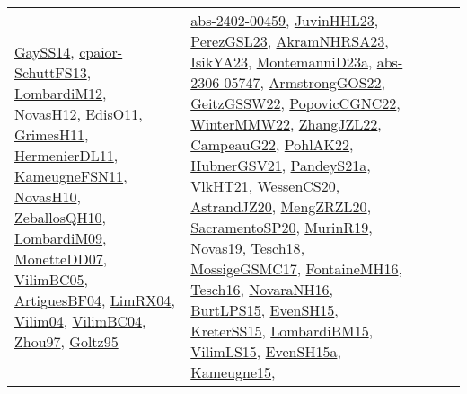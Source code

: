 {\begin{longtable}{llp{6cm}p{6cm}p{6cm}}
\href{papers/GaySS14.pdf}{GaySS14}\cite{GaySS14}, \href{papers/cpaior-SchuttFS13.pdf}{cpaior-SchuttFS13}\cite{cpaior-SchuttFS13}, \href{articles/LombardiM12.pdf}{LombardiM12}\cite{LombardiM12}, \href{articles/NovasH12.pdf}{NovasH12}\cite{NovasH12}, \href{papers/EdisO11.pdf}{EdisO11}\cite{EdisO11}, \href{papers/GrimesH11.pdf}{GrimesH11}\cite{GrimesH11}, \href{papers/HermenierDL11.pdf}{HermenierDL11}\cite{HermenierDL11}, \href{papers/KameugneFSN11.pdf}{KameugneFSN11}\cite{KameugneFSN11}, \href{articles/NovasH10.pdf}{NovasH10}\cite{NovasH10}, \href{articles/ZeballosQH10.pdf}{ZeballosQH10}\cite{ZeballosQH10}, \href{papers/LombardiM09.pdf}{LombardiM09}\cite{LombardiM09}, \href{papers/MonetteDD07.pdf}{MonetteDD07}\cite{MonetteDD07}, \href{articles/VilimBC05.pdf}{VilimBC05}\cite{VilimBC05}, \href{papers/ArtiguesBF04.pdf}{ArtiguesBF04}\cite{ArtiguesBF04}, \href{papers/LimRX04.pdf}{LimRX04}\cite{LimRX04}, \href{papers/Vilim04.pdf}{Vilim04}\cite{Vilim04}, \href{papers/VilimBC04.pdf}{VilimBC04}\cite{VilimBC04}, \href{articles/Zhou97.pdf}{Zhou97}\cite{Zhou97}, \href{papers/Goltz95.pdf}{Goltz95}\cite{Goltz95} & \href{articles/abs-2402-00459.pdf}{abs-2402-00459}\cite{abs-2402-00459}, \href{papers/JuvinHHL23.pdf}{JuvinHHL23}\cite{JuvinHHL23}, \href{papers/PerezGSL23.pdf}{PerezGSL23}\cite{PerezGSL23}, \href{articles/AkramNHRSA23.pdf}{AkramNHRSA23}\cite{AkramNHRSA23}, \href{articles/IsikYA23.pdf}{IsikYA23}\cite{IsikYA23}, \href{articles/MontemanniD23a.pdf}{MontemanniD23a}\cite{MontemanniD23a}, \href{articles/abs-2306-05747.pdf}{abs-2306-05747}\cite{abs-2306-05747}, \href{papers/ArmstrongGOS22.pdf}{ArmstrongGOS22}\cite{ArmstrongGOS22}, \href{papers/GeitzGSSW22.pdf}{GeitzGSSW22}\cite{GeitzGSSW22}, \href{papers/PopovicCGNC22.pdf}{PopovicCGNC22}\cite{PopovicCGNC22}, \href{papers/WinterMMW22.pdf}{WinterMMW22}\cite{WinterMMW22}, \href{papers/ZhangJZL22.pdf}{ZhangJZL22}\cite{ZhangJZL22}, \href{articles/CampeauG22.pdf}{CampeauG22}\cite{CampeauG22}, \href{articles/PohlAK22.pdf}{PohlAK22}\cite{PohlAK22}, \href{articles/HubnerGSV21.pdf}{HubnerGSV21}\cite{HubnerGSV21}, \href{articles/PandeyS21a.pdf}{PandeyS21a}\cite{PandeyS21a}, \href{articles/VlkHT21.pdf}{VlkHT21}\cite{VlkHT21}, \href{papers/WessenCS20.pdf}{WessenCS20}\cite{WessenCS20}, \href{articles/AstrandJZ20.pdf}{AstrandJZ20}\cite{AstrandJZ20}, \href{articles/MengZRZL20.pdf}{MengZRZL20}\cite{MengZRZL20}, \href{articles/SacramentoSP20.pdf}{SacramentoSP20}\cite{SacramentoSP20}, \href{papers/MurinR19.pdf}{MurinR19}\cite{MurinR19}, \href{articles/Novas19.pdf}{Novas19}\cite{Novas19}, \href{papers/Tesch18.pdf}{Tesch18}\cite{Tesch18}, \href{papers/MossigeGSMC17.pdf}{MossigeGSMC17}\cite{MossigeGSMC17}, \href{papers/FontaineMH16.pdf}{FontaineMH16}\cite{FontaineMH16}, \href{papers/Tesch16.pdf}{Tesch16}\cite{Tesch16}, \href{articles/NovaraNH16.pdf}{NovaraNH16}\cite{NovaraNH16}, \href{papers/BurtLPS15.pdf}{BurtLPS15}\cite{BurtLPS15}, \href{papers/EvenSH15.pdf}{EvenSH15}\cite{EvenSH15}, \href{papers/KreterSS15.pdf}{KreterSS15}\cite{KreterSS15}, \href{papers/LombardiBM15.pdf}{LombardiBM15}\cite{LombardiBM15}, \href{papers/VilimLS15.pdf}{VilimLS15}\cite{VilimLS15}, \href{articles/EvenSH15a.pdf}{EvenSH15a}\cite{EvenSH15a}, \href{articles/Kameugne15.pdf}{Kameugne15}\cite{Kameugne15}, 
\end{longtable}}
